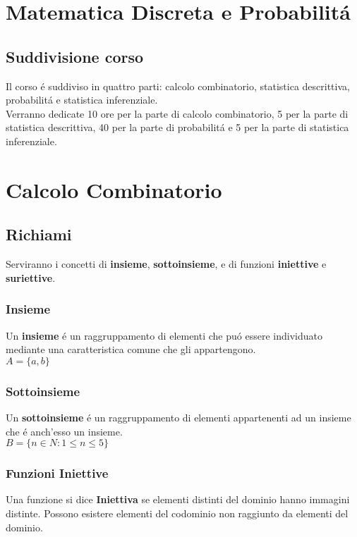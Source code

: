 \documentclass[11pt]{article}
\begin{document}
    \section*{\huge \centering Matematica Discreta e Probabilit\'a }
     \subsection*{Suddivisione corso} 
    
        Il corso \'e suddiviso in quattro parti: calcolo combinatorio,
        statistica descrittiva, probabilit\'a e statistica inferenziale. \\
        Verranno dedicate 10 ore per la parte di calcolo combinatorio, 5 
        per la parte di statistica descrittiva, 40 per la parte di probabilit\'a e 5 per la parte di statistica inferenziale.
   
   \section{Calcolo Combinatorio}
    \subsection{Richiami}
        Serviranno i concetti di \textbf{insieme},\textbf{ sottoinsieme}, e di funzioni \textbf{iniettive} e \textbf{suriettive}.
        \subsubsection{Insieme}
            Un \textbf{insieme} \'e un raggruppamento di elementi che pu\'o essere individuato mediante una caratteristica comune che gli appartengono.\\
            $A=\{a,b\}$
        \subsubsection{Sottoinsieme}
            Un \textbf{sottoinsieme} \'e un raggruppamento di elementi appartenenti ad un insieme che \'e anch'esso un insieme.\\
            $B=\{n \in N : 1\leq n \leq 5 \} $ 
        \subsubsection{Funzioni Iniettive}
            Una funzione si dice \textbf{Iniettiva} se elementi distinti del dominio hanno immagini distinte. Possono esistere elementi del codominio non raggiunto da elementi del dominio.
\end{document}
